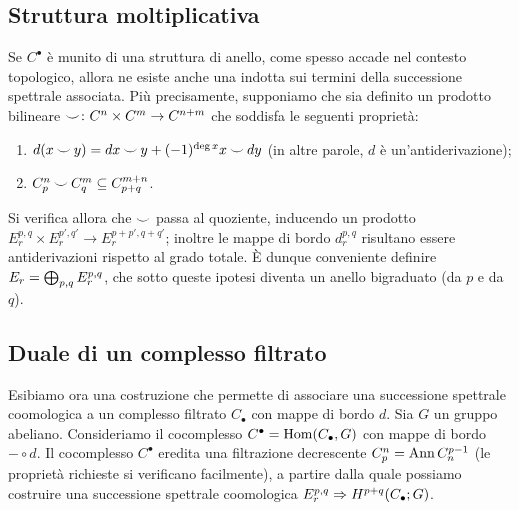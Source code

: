 \subsection{Struttura moltiplicativa}\label{cohomological-spectral-sequence:multiplicative-structure}
Se \(C^\bullet\) è munito di una struttura di anello, come spesso accade nel contesto topologico, allora ne esiste anche una indotta sui termini della successione spettrale associata. Più precisamente, supponiamo che sia definito un prodotto bilineare \(\map{\cupp}{C^n\times C^m}{C^{n+m}}\) che soddisfa le seguenti proprietà:
\begin{enumerate}
\item \(d(x\mathbin{\smile} y)=dx\mathbin{\smile} y+(-1)^{\deg x}x\mathbin{\smile} dy\) (in altre parole, \(d\) è un'antiderivazione);
\item \(C^n_p\mathbin{\smile} C^m_q\subseteq C^{m+n}_{p+q}\).
\end{enumerate}
Si verifica  allora che \(\mathbin{\smile}\) passa al quoziente, inducendo un prodotto \(E^{p,q}_r\times E^{p',q'}_r\to E^{p+p',q+q'}_r\); inoltre le mappe di bordo \(d^{p,q}_r\) risultano essere antiderivazioni rispetto al grado totale. È dunque conveniente definire \(E_r=\bigoplus_{p,q}E^{p,q}_r\), che sotto queste ipotesi diventa un anello bigraduato (da \(p\) e da \(q\)).

\subsection{Duale di un complesso filtrato}\label{cohomological-spectral-sequence:dual-complex}
Esibiamo ora una costruzione che permette di associare una successione spettrale coomologica a un complesso filtrato \(C_\bullet\) con mappe di bordo \(d\). Sia \(G\) un gruppo abeliano. Consideriamo il cocomplesso \(C^\bullet=\operatorname{Hom}(C_\bullet,G)\) con mappe di bordo \(-\circ d\). Il cocomplesso \(C^\bullet\) eredita una filtrazione decrescente \(C^n_p=\operatorname{Ann} C_n^{p-1}\) (le proprietà richieste si verificano facilmente), a partire dalla quale possiamo costruire una successione spettrale coomologica \(E^{p,q}_r\Rightarrow H^{p+q}(C_\bullet;G)\).

